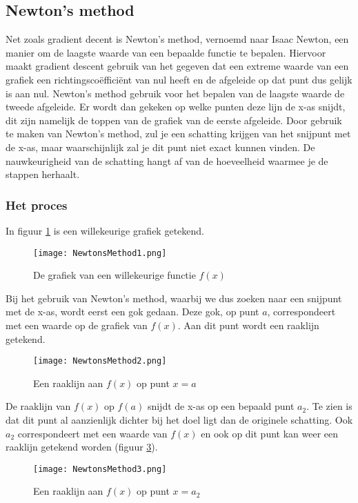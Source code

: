 \subsection{Newton's method}
Net zoals gradient decent is Newton's method, vernoemd naar Isaac Newton, een manier om de laagste waarde van een bepaalde functie te bepalen. Hiervoor maakt gradient descent gebruik van het gegeven dat een extreme waarde van een grafiek een richtingsco\"effici\"ent van nul heeft en de afgeleide op dat punt dus gelijk is aan nul. Newton's method gebruik voor het bepalen van de laagste waarde de tweede afgeleide. Er wordt dan gekeken op welke punten deze lijn de x-as snijdt, dit zijn namelijk de toppen van de grafiek van de eerste afgeleide. Door gebruik te maken van Newton's method, zul je een schatting krijgen van het snijpunt met de x-as, maar waarschijnlijk zal je dit punt niet exact kunnen vinden. De nauwkeurigheid van de schatting hangt af van de hoeveelheid waarmee je de stappen herhaalt.

\subsubsection{Het proces}
In figuur \ref{fig:NM1} is een willekeurige grafiek getekend.

\begin{figure}[H]
  \centering
    \texttt{[image: NewtonsMethod1.png]}
  \caption{De grafiek van een willekeurige functie $ f(x) $}
  \label{fig:NM1}
\end{figure}

Bij het gebruik van Newton’s method, waarbij we dus zoeken naar een snijpunt met de x-as, wordt eerst een gok gedaan. Deze gok, op punt $a$, correspondeert met een waarde op de grafiek van $ f(x) $. Aan dit punt wordt een raaklijn getekend.

\begin{figure}[h]
  \centering
    \texttt{[image: NewtonsMethod2.png]}
  \caption{Een raaklijn aan $ f(x) $ op punt $ x = a $}
  \label{fig:NM2}
\end{figure}

De raaklijn van $ f(x) $ op $ f(a) $ snijdt de x-as op een bepaald punt $ a_2 $. Te zien is dat dit punt al aanzienlijk dichter bij het doel ligt dan de originele schatting. Ook $ a_2 $ correspondeert met een waarde van $ f(x) $ en ook op dit punt kan weer een raaklijn getekend worden (figuur \ref{fig:NM3}).

\begin{figure}[h]
  \centering
    \texttt{[image: NewtonsMethod3.png]}
  \caption{Een raaklijn aan $ f(x) $ op punt $ x = a_2 $}
  \label{fig:NM3}
\end{figure}

